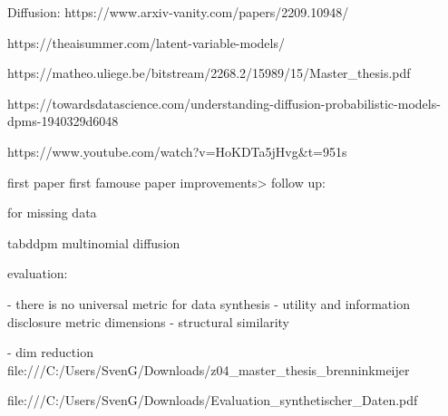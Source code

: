Diffusion:
https://www.arxiv-vanity.com/papers/2209.10948/

https://theaisummer.com/latent-variable-models/

https://matheo.uliege.be/bitstream/2268.2/15989/15/Master_thesis.pdf

https://towardsdatascience.com/understanding-diffusion-probabilistic-models-dpms-1940329d6048 

https://www.youtube.com/watch?v=HoKDTa5jHvg&t=951s


first paper \cite{sohl-dickstein2015DeepUnsupervisedLearning}
first famouse paper \cite{ho2020DenoisingDiffusionProbabilistic}
improvements> \cite{nichol2021ImprovedDenoisingDiffusion}
follow up: \cite{dhariwal2021DiffusionModelsBeat}

\cite{ho2022ClassifierFreeDiffusionGuidance}

\cite{rombach2022HighResolutionImageSynthesis}



\cite{zheng2022DiffusionModelsMissing} for missing data

\cite{kotelnikov2022TabDDPMModellingTabular} tabddpm
\cite{hoogeboom2021ArgmaxFlowsMultinomial} multinomial diffusion


evaluation:

- there is no universal metric for data synthesis \cite{hernandez2022SyntheticDataGeneration}
- utility and information disclosure metric dimensions \cite{goncalves2020GenerationEvaluationSynthetic}
- structural similarity \cite{elemam2020SevenWaysEvaluate}

- dim reduction
file:///C:/Users/SvenG/Downloads/z04_master_thesis_brenninkmeijer%

file:///C:/Users/SvenG/Downloads/Evaluation_synthetischer_Daten.pdf
